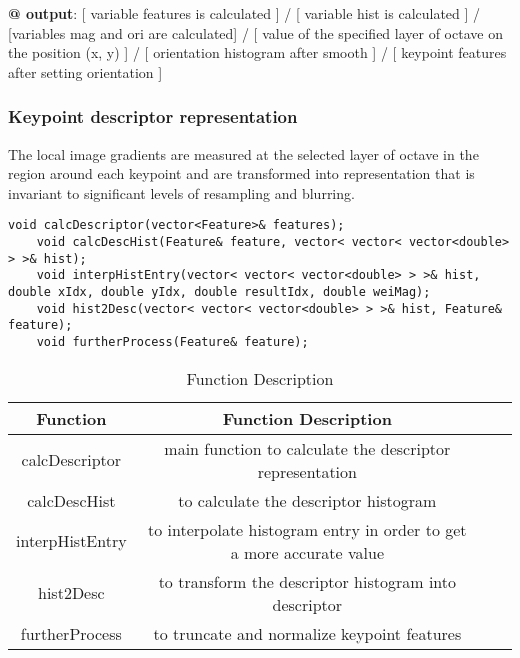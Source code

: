 \documentclass[paper=a4, fontsize=11pt]{scrartcl} %
\numberwithin{equation}{section} %
\numberwithin{figure}{section} %
\numberwithin{table}{section} %
\begin{document}
\textbf{@ output}: [ variable features is calculated ] / [ variable hist is calculated ] / [variables mag and ori are calculated] / [ value of the specified layer of octave on the position (x, y) ] / [ orientation histogram after smooth ] / [ keypoint features after setting orientation ]


\subsubsection{Keypoint descriptor representation}

The local image gradients are measured at the selected layer of octave in the region around each keypoint and are transformed into representation that is invariant to significant levels of resampling and blurring.

\begin{lstlisting}
void calcDescriptor(vector<Feature>& features);
    void calcDescHist(Feature& feature, vector< vector< vector<double> > >& hist);
    void interpHistEntry(vector< vector< vector<double> > >& hist, double xIdx, double yIdx, double resultIdx, double weiMag);
    void hist2Desc(vector< vector< vector<double> > >& hist, Feature& feature);
    void furtherProcess(Feature& feature);
\end{lstlisting}

\begin{table}[h]
    \centering
    \begin{tabular}{|c|c| lp{}}
        \hline
        \textbf{Function} & \textbf{Function Description} \\\hline
calcDescriptor & main function to calculate the descriptor representation\\\hline
calcDescHist& to calculate the descriptor histogram\\\hline
interpHistEntry& to interpolate histogram entry in order to get a more accurate value\\\hline
hist2Desc& to transform the descriptor histogram into descriptor\\\hline
furtherProcess & to truncate and normalize keypoint features\\\hline
    \end{tabular}
    \caption{Function Description}\label{nolock}
\end{table}
\end{document}
